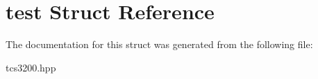 \hypertarget{structtest}{}\section{test Struct Reference}
\label{structtest}


The documentation for this struct was generated from the following file\+:\begin{DoxyCompactItemize}
\item 
tcs3200.\+hpp\end{DoxyCompactItemize}
